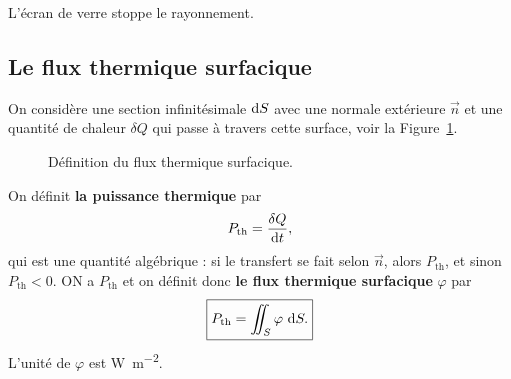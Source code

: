        \begin{example}
            L'écran de verre stoppe le rayonnement.
        \end{example}
    
    \subsection{Le flux thermique surfacique}

        On considère une section infinitésimale $\mathrm{d} S$ avec une normale extérieure $\vec{n}$ et une quantité de chaleur $\delta Q$ qui passe à travers cette surface, voir la Figure~\ref{fig:flux_thermique_surfacique_section}.

        \begin{figure}
            \centering
            \caption{Définition du flux thermique surfacique.}    
            \label{fig:flux_thermique_surfacique_section}
        \end{figure}

        \begin{definition}
            On définit \textbf{la puissance thermique} par 
            \begin{equation}
                P_{\text{th}}=\frac{\delta Q}{\mathrm{d} t},    
            \end{equation}
            qui est une quantité algébrique : si le transfert se fait selon $\vec{n}$, alors $P_{\text{th}}$, et sinon $P_{\text{th}}<0$. ON a $P_{\text{th}}$ et on définit donc \textbf{le flux thermique surfacique} $\varphi$ par
            \begin{equation}
                \boxed{
                    P_{\text{th}}=\iint_{S}\varphi~\mathrm{d} S.
                }
            \end{equation} 
            L'unité de $\varphi$ est \si{\watt\per\metre\squared}.
        \end{definition}

